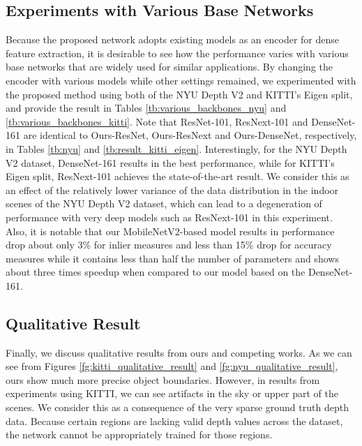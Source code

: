 \documentclass[10pt,twocolumn,letterpaper]{article}
\begin{document}
\subsection{Experiments with Various Base Networks}
\label{sec:experiments_with_various_base_networks}
Because the proposed network adopts existing models as an encoder for dense feature extraction, it is desirable to see how the performance varies with various base networks that are widely used for similar applications.
By changing the encoder with various models while other settings remained, we experimented with the proposed method using both of the NYU Depth V2 and KITTI's Eigen split, and provide the result in Tables \ref{tb:various_backbones_nyu} and \ref{tb:various_backbones_kitti}.
Note that ResNet-101, ResNext-101 and DenseNet-161 are identical to Ours-ResNet, Ours-ResNext and Ours-DenseNet, respectively, in Tables \ref{tb:nyu} and \ref{tb:result_kitti_eigen}.
Interestingly, for the NYU Depth V2 dataset, DenseNet-161 results in the best performance, while for KITTI's Eigen split, ResNext-101 achieves the state-of-the-art result.
We consider this as an effect of the relatively lower variance of the data distribution in the indoor scenes of the NYU Depth V2 dataset, which can lead to a degeneration of performance with very deep models such as ResNext-101 in this experiment.
Also, it is notable that our MobileNetV2-based model results in performance drop about only 3\% for inlier measures and less than 15\% drop for accuracy measures while it contains less than half the number of parameters and shows about three times speedup when compared to our model based on the DenseNet-161.

\subsection{Qualitative Result}
\label{sec:qualitative_result}
Finally, we discuss qualitative results from ours and competing works.
As we can see from Figures \ref{fg:kitti_qualitative_result} and \ref{fg:nyu_qualitative_result}, ours show much more precise object boundaries.
However, in results from experiments using KITTI, we can see artifacts in the sky or upper part of the scenes.
We consider this as a consequence of the very sparse ground truth depth data.
Because certain regions are lacking valid depth values across the dataset, the network cannot be appropriately trained for those regions.
\end{document}
